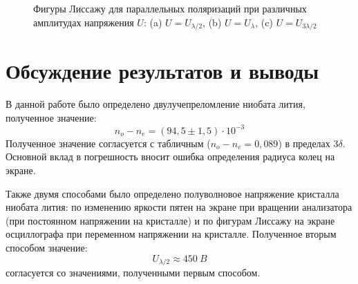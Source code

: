 \documentclass[a4paper, 12pt]{article}
\begin{document}
\begin{figure}[h]
\begin{minipage}[h]{0.3\linewidth}
		\end{minipage}
		\caption{Фигуры Лиссажу для параллельных поляризаций при различных амплитудах напряжения $U$: (a) $U = U_{\lambda/2}$, (b) $U = U_{\lambda}$, (c) $U = U_{3\lambda/2}$ }
		\label{lis}
	\end{figure}
	
\newpage

\section{Обсуждение результатов и выводы}

В данной работе было определено двулучепреломление ниобата лития, полученное значение:
$$\boxed{n_o - n_e = (94,5\pm1,5) \cdot 10^{-3}}$$
Полученное значение согласуется с табличным ($n_o - n_e = 0,089$) в пределах $3\delta$. Основной вклад в погрешность вносит ошибка определения радиуса колец на экране.


Также двумя способами было определено полуволновое напряжение кристалла ниобата лития: по изменению яркости пятен на экране при вращении анализатора (при постоянном напряжении на кристалле) и по фигурам Лиссажу на экране осциллографа при переменном напряжении на кристалле. Полученное вторым способом значение:
$$\boxed{U_{\lambda/2} \approx 450~B}$$
согласуется со значениями, полученными первым способом.
\end{document}
